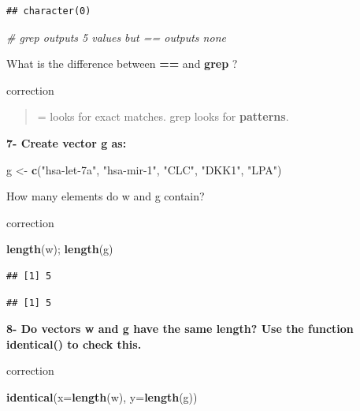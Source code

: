 \documentclass[]{book}
\newenvironment{Shaded}{\begin{snugshade}}{\end{snugshade}}
\newcommand{\CommentTok}[1]{\textcolor[rgb]{0.56,0.35,0.01}{\textit{#1}}}
\newcommand{\DataTypeTok}[1]{\textcolor[rgb]{0.13,0.29,0.53}{#1}}
\newcommand{\KeywordTok}[1]{\textcolor[rgb]{0.13,0.29,0.53}{\textbf{#1}}}
\newcommand{\NormalTok}[1]{#1}
\newcommand{\StringTok}[1]{\textcolor[rgb]{0.31,0.60,0.02}{#1}}
\begin{document}
\begin{verbatim}
## character(0)
\end{verbatim}

\begin{Shaded}
\begin{Highlighting}[]
\CommentTok{# grep outputs 5 values but == outputs none}
\end{Highlighting}
\end{Shaded}

What is the difference between \textbf{==} and \textbf{grep} ?

correction

\begin{quote}
= looks for exact matches.
grep looks for \textbf{patterns}.
\end{quote}

\textbf{7- Create vector g as:}

\begin{Shaded}
\begin{Highlighting}[]
\NormalTok{g <-}\StringTok{ }\KeywordTok{c}\NormalTok{(}\StringTok{"hsa-let-7a"}\NormalTok{, }\StringTok{"hsa-mir-1"}\NormalTok{, }\StringTok{"CLC"}\NormalTok{, }\StringTok{"DKK1"}\NormalTok{, }\StringTok{"LPA"}\NormalTok{)}
\end{Highlighting}
\end{Shaded}

How many elements do w and g contain?

correction

\begin{Shaded}
\begin{Highlighting}[]
\KeywordTok{length}\NormalTok{(w); }\KeywordTok{length}\NormalTok{(g)}
\end{Highlighting}
\end{Shaded}

\begin{verbatim}
## [1] 5
\end{verbatim}

\begin{verbatim}
## [1] 5
\end{verbatim}

\textbf{8- Do vectors w and g have the same length? Use the function identical() to check this.}

correction

\begin{Shaded}
\begin{Highlighting}[]
\KeywordTok{identical}\NormalTok{(}\DataTypeTok{x=}\KeywordTok{length}\NormalTok{(w), }\DataTypeTok{y=}\KeywordTok{length}\NormalTok{(g))}
\end{Highlighting}
\end{Shaded}
\end{document}
